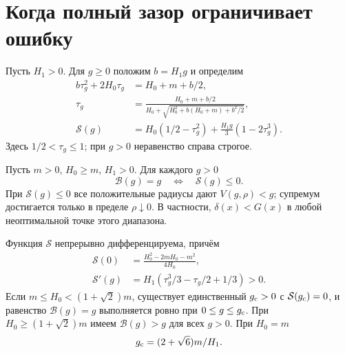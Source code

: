 \section{Когда полный зазор ограничивает ошибку}
\label{gapregime:section}
Пусть $H_1>0$. Для $g\ge0$ положим $b=H_1g$ и определим
\begin{align}
 b\tau_g^2+2H_0\tau_g&=H_0+m+b/2,
       \label{gapregime:switch}\\
 \tau_g&=\frac{H_0+m+b/2}
 {H_0+\sqrt{H_0^2+b(H_0+m)+b^2/2}},
       \label{gapregime:tau}\\
 \mathcal S(g)&=H_0(1/2-\tau_g^2)
             +\frac{H_1g}{3}(1-2\tau_g^3).
       \label{gapregime:coefficient}
\end{align}
Здесь $1/2<\tau_g\le1$; при $g>0$ неравенство справа строгое.

\begin{theorem}
\label{gapregime:main}
Пусть $m>0$, $H_0\ge m$, $H_1>0$. Для каждого $g>0$
\begin{equation}\label{gapregime:equivalence}
 \mathcal B(g)=g\quad\Longleftrightarrow\quad\mathcal S(g)\le0.
\end{equation}
При $\mathcal S(g)\le0$ все положительные радиусы дают
$V(g,\rho)<g$; супремум достигается только в пределе $\rho\downarrow0$.
В частности, $\delta(x)<G(x)$ в любой неоптимальной точке
этого диапазона.

Функция $\mathcal S$ непрерывно дифференцируема, причём
\begin{align}
 \mathcal S(0)&=\frac{H_0^2-2mH_0-m^2}{4H_0},
       \label{gapregime:initial}\\
 \mathcal S'(g)&=H_1(\tau_g^3/3-\tau_g/2+1/3)>0.
       \label{gapregime:derivative}
\end{align}
Если $m\le H_0<(1+\sqrt2)m$, существует единственный
$g_{\rm c}>0$ с $\mathcal S(g_{\rm c})=0$, и равенство
$\mathcal B(g)=g$ выполняется ровно при $0\le g\le g_{\rm c}$.
При $H_0\ge(1+\sqrt2)m$ имеем $\mathcal B(g)>g$ для всех $g>0$.
При $H_0=m$
\begin{equation}\label{gapregime:unit-threshold}
 g_{\rm c}=(2+\sqrt6)m/H_1.
\end{equation}
\end{theorem}


